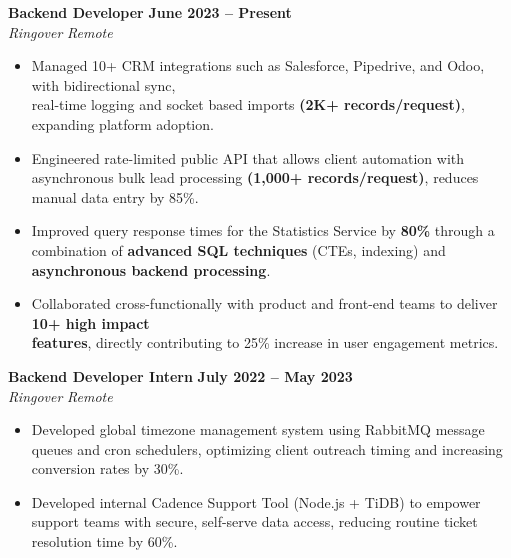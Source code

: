 \documentclass[a4paper,12pt]{article}
\newenvironment{experience}[4]
{%
    \noindent\textbf{#1} \hfill \textbf{#2} \\
    \textit{#3} \hfill \textit{#4} 
    \begin{itemize}[nosep, leftmargin=1.2em, itemsep=1pt, label=$\bullet$]
}
{%
    \end{itemize}
}
\begin{document}
\begin{experience}
 {Backend Developer}                        %
  {June 2023 -- Present}                    %
  {Ringover}                               %
  {Remote}                                 %
    \item Managed 10+ CRM integrations such as Salesforce, Pipedrive, and Odoo, with bidirectional sync,\\real-time logging and socket based imports \textbf{(2K+ records/request)}, expanding platform adoption.
    \item Engineered rate-limited public API that allows client automation with asynchronous bulk lead processing \textbf{(1,000+ records/request)}, reduces manual data entry by 85\%.  
    \item Improved query response times for the Statistics Service by \textbf{80\%} through a combination of \textbf{advanced SQL techniques} (CTEs, indexing) and \textbf{asynchronous backend processing}.
    \item Collaborated cross-functionally with product and front-end teams to deliver \textbf{10+ high impact\\features}, directly contributing to 25\% increase in user engagement metrics.
\end{experience}

\begin{experience}
  {Backend Developer Intern}               %
  {July 2022 -- May 2023}                  %
  {Ringover}                               %
  {Remote}                                 %
   \item Developed global timezone management system using RabbitMQ message queues and cron schedulers, optimizing client outreach timing and increasing conversion rates by 30\%.
    \item Developed internal Cadence Support Tool (Node.js + TiDB) to empower support teams with secure, self-serve data access, reducing routine ticket resolution time by 60\%. 
\end{experience}
\end{document}
